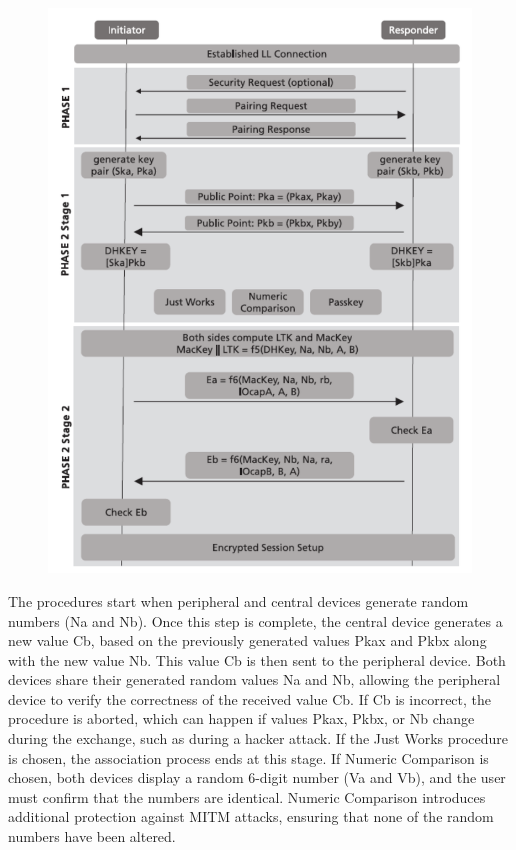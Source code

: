 \documentclass{Configuration_Files/PoliMi3i_thesis}
\begin{document}
\begin{figure}[H]
    \centering
    \includegraphics[scale=0.7]{Bluetooth_Security/5.png}
    \label{fig:pairing_procedure}
\end{figure}

The procedures start when peripheral and central devices generate random numbers (Na and Nb). Once this step is complete, the central device generates a new value Cb, based on the previously generated values Pkax and Pkbx along with the new value Nb. This value Cb is then sent to the peripheral device. Both devices share their generated random values Na and Nb, allowing the peripheral device to verify the correctness of the received value Cb. If Cb is incorrect, the procedure is aborted, which can happen if values Pkax, Pkbx, or Nb change during the exchange, such as during a hacker attack. If the Just Works procedure is chosen, the association process ends at this stage. If Numeric Comparison is chosen, both devices display a random 6-digit number (Va and Vb), and the user must confirm that the numbers are identical. Numeric Comparison introduces additional protection against MITM attacks, ensuring that none of the random numbers have been altered.
\end{document}
